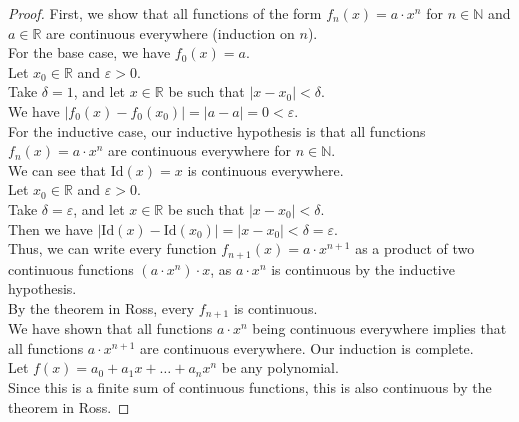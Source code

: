 \documentclass{article}
\begin{document}
\begin{proof}
    First, we show that all functions of the form $f_n(x)=a\cdot x^n$ for $n \in \mathbb N$ and $a \in \mathbb R$ are continuous everywhere (induction on $n$). \\
    For the base case, we have $f_0(x)=a$. \\
    Let $x_0\in \mathbb R$ and $\varepsilon > 0$. \\
    Take $\delta = 1$, and let $x \in \mathbb R$ be such that $|x-x_0| < \delta$. \\
    We have $|f_0(x)-f_0(x_0)| = |a-a|=0<\varepsilon$. \\
    For the inductive case, our inductive hypothesis is that all functions $f_n(x)=a \cdot x^n$ are continuous everywhere for $n \in \mathbb N$. \\
    We can see that $\mathrm{Id}(x)=x$ is continuous everywhere. \\
    Let $x_0 \in \mathbb R$ and $\varepsilon > 0$. \\
    Take $\delta = \varepsilon$, and let $x \in \mathbb R$ be such that $|x-x_0|<\delta$. \\
    Then we have $|\mathrm{Id}(x)-\mathrm{Id}(x_0)| = |x-x_0|<\delta = \varepsilon$. \\
    Thus, we can write every function $f_{n+1}(x)=a \cdot x^{n+1}$ as a product of two continuous functions $(a\cdot x^n)\cdot x$, as $a\cdot x^n$ is continuous by the inductive hypothesis. \\
    By the theorem in Ross, every $f_{n+1}$ is continuous. \\
    We have shown that all functions $a \cdot x^n$ being continuous everywhere implies that all functions $a \cdot x^{n+1}$ are continuous everywhere. Our induction is complete. \\
    Let $f(x)=a_0+a_1 x+\dots + a_n x^n$ be any polynomial. \\
    Since this is a finite sum of continuous functions, this is also continuous by the theorem in Ross.
\end{proof}
\end{document}
